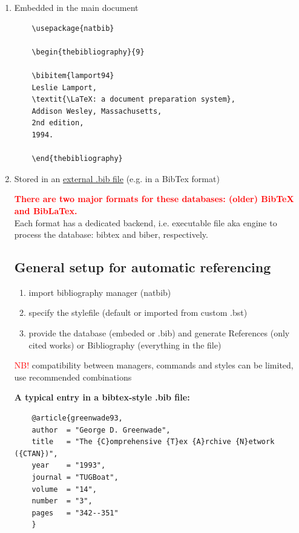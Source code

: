 \documentclass[a4paper,11pt]{article}
\begin{document}
\begin{enumerate}
\item Embedded in the main document
	\begin{lstlisting}
	\usepackage{natbib}
	
	\begin{thebibliography}{9}
	
	\bibitem{lamport94}
	Leslie Lamport,
	\textit{\LaTeX: a document preparation system},
	Addison Wesley, Massachusetts,
	2nd edition,
	1994.
	
	\end{thebibliography}
	\end{lstlisting}

\item Stored in an \href{run:./7_NLP-tasks-complexity.bib}{external .bib file} (e.g. in a BibTex format)

\medskip
\textbf{\textcolor{red}{There are two major formats for these databases: (older) BibTeX and BibLaTex.}}\\
Each format has a dedicated backend, i.e. executable file aka engine to process the database: bibtex and biber, respectively.\\

\newpage


\subsection{General setup for automatic referencing}

\begin{enumerate}
	\item import bibliography manager (natbib) 
	\item specify the stylefile (default or imported from custom .bst)
	\item provide the database (embeded or .bib) and generate References (only cited works) or Bibliography (everything in the file)

\end{enumerate}
	\textcolor{red}{NB!} compatibility between managers, commands and styles can be limited, use recommended combinations

\textbf{A typical entry in a bibtex-style .bib file:}\\

\begin{lstlisting}
	@article{greenwade93,
	author  = "George D. Greenwade",
	title   = "The {C}omprehensive {T}ex {A}rchive {N}etwork ({CTAN})",
	year    = "1993",
	journal = "TUGBoat",
	volume  = "14",
	number  = "3",
	pages   = "342--351"
	}
\end{lstlisting}

\end{enumerate}	
\end{document}
